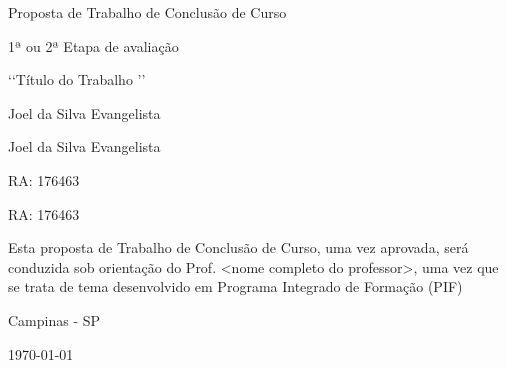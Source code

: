 \begin{titlepage}
\begin{center}
\vfill





{\fontsize{28}{\baselineskip}\selectfont
Proposta de Trabalho de Conclusão de Curso 
}

\vfill





{\fontsize{28}{\baselineskip}\selectfont
1ª ou 2ª Etapa de avaliação
}

\vfill





{\fontsize{36}{\baselineskip}\selectfont
‘‘Título do Trabalho ’’
}

\vfill





\begin{minipage}{0.7\linewidth}
	{\onehalfspacing\fontsize{20}{\baselineskip}\selectfont
	
    Joel da Silva Evangelista
    
    Joel da Silva Evangelista 
    
    }
\end{minipage}
\begin{minipage}{0.25\linewidth}
	{\onehalfspacing\fontsize{18}{\baselineskip}\selectfont
	RA: 176463
	
	RA: 176463
	
	}
\end{minipage}

\vspace{10mm}






\begin{flushleft}
    {\fontsize{12}{\baselineskip}\selectfont
    Esta proposta de Trabalho de Conclusão de Curso, uma vez aprovada, será conduzida sob orientação do Prof. <nome completo do professor>, uma vez que se trata de tema desenvolvido em Programa Integrado de Formação (PIF)
    }
\end{flushleft}

\vfill





{\fontsize{14}{\baselineskip}\selectfont
	Campinas - SP

	\today
}

\end{center}
\end{titlepage}